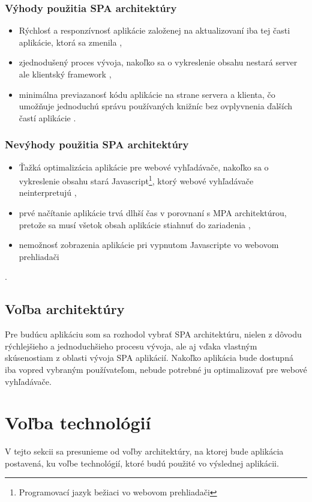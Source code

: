 \subsubsection*{Výhody použitia SPA architektúry}

\begin{itemize}
	\item Rýchlosť a responzívnosť aplikácie založenej na aktualizovaní iba tej časti aplikácie, ktorá sa zmenila \cite{spa-vs-mpa-1},
	\item zjednodušený proces vývoja, nakoľko sa o vykreslenie obsahu nestará server ale klientský framework \cite{spa-vs-mpa-3},
	\item minimálna previazanosť kódu aplikácie na strane servera a klienta, čo umožňuje jednoduchú správu používaných knižníc bez ovplyvnenia ďalších častí aplikácie \cite{spa-vs-mpa-2}.
\end{itemize}


\subsubsection*{Nevýhody použitia SPA architektúry}

\begin{itemize}
	\item Ťažká optimalizácia aplikácie pre webové vyhľadávače, nakoľko sa o vykreslenie obsahu stará Javascript\footnote{Programovací jazyk bežiaci vo webovom prehliadači}, ktorý webové vyhľadávače neinterpretujú \cite{spa-vs-mpa-1},
	\item prvé načítanie aplikácie trvá dlhší čas v porovnaní s MPA architektúrou, pretože sa musí všetok obsah aplikácie stiahnuť do zariadenia \cite{spa-vs-mpa-1},
	\item nemožnosť zobrazenia aplikácie pri vypnutom Javascripte vo webovom prehliadači \cite{spa-vs-mpa-2}
\end{itemize}.


\subsection{Voľba architektúry}

Pre budúcu aplikáciu som sa rozhodol vybrať SPA architektúru, nielen z dôvodu rýchlejšieho a jednoduchšieho procesu vývoja, ale aj vďaka vlastným skúsenostiam z oblasti vývoja SPA aplikácií. Nakoľko aplikácia bude dostupná iba vopred vybraným používateľom, nebude potrebné ju optimalizovať pre webové vyhľadávače.

\section{Voľba technológií}
V tejto sekcii sa presunieme od voľby architektúry, na ktorej bude aplikácia postavená, ku voľbe technológií, ktoré budú použité vo výslednej aplikácii.

